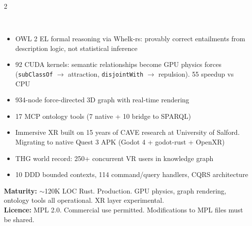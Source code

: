 \documentclass[10pt,a4paper]{article}
\begin{document}
\begin{multicols}{2}
\raggedright

{\color{cyan}\faProjectDiagram}\;\\[2pt]
{\small
\begin{itemize}[leftmargin=8pt,itemsep=0pt,parsep=0pt,topsep=1pt,label={\color{cyan}\textbullet}]
  \item OWL 2 EL formal reasoning via Whelk-rs: provably correct entailments from description logic, not statistical inference
  \item 92 CUDA kernels: semantic relationships become GPU physics forces (\texttt{subClassOf} $\to$ attraction, \texttt{disjointWith} $\to$ repulsion). 55\texttimes{} speedup vs CPU
  \item 934-node force-directed 3D graph with real-time rendering
  \item 17 MCP ontology tools (7 native + 10 bridge to SPARQL)
  \item Immersive XR built on 15 years of CAVE research at University of Salford. Migrating to native Quest 3 APK (Godot 4 + godot-rust + OpenXR)
  \item THG world record: 250+ concurrent VR users in knowledge graph
  \item 10 DDD bounded contexts, 114 command/query handlers, CQRS architecture
\end{itemize}
\textbf{Maturity:} $\sim$120K LOC Rust. Production. GPU physics, graph rendering, ontology tools all operational. XR layer experimental.\\
\textbf{Licence:} MPL 2.0. Commercial use permitted. Modifications to MPL files must be shared.
}

\vspace{6pt}


\end{multicols}
\end{document}
